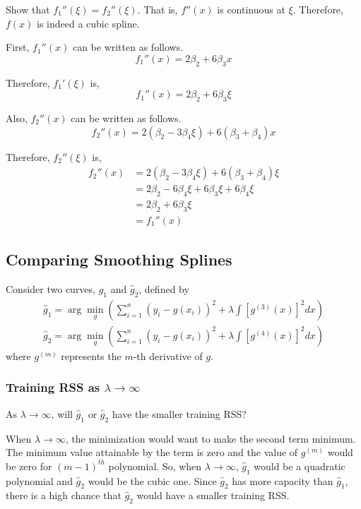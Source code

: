 \documentclass{article}
\begin{document}
\question
Show that $f_1''\left(\xi\right) = f_2''\left(\xi\right)$.
That is, $f''\left(x\right)$ is continuous at $\xi$.
Therefore, $f\left(x\right)$ is indeed a cubic spline.

\answer
First, $f_1''\left(x\right)$ can be written as follows.
\[
    f_1''\left(x\right) = 2 \beta_2 + 6 \beta_3 x
\]

Therefore, $f_1'\left(\xi\right)$ is,
\[
    f_1''\left(x\right) = 2 \beta_2 + 6 \beta_3 \xi
\]

Also, $f_2''\left(x\right)$ can be written as follows.
\[
    f_2''\left(x\right) = 2 \left(\beta_2 - 3 \beta_4 \xi \right) + 6 \left(\beta_3 + \beta_4\right) x
\]

Therefore, $f_2''\left(\xi\right)$ is,
\begin{equation*}
    \begin{split}
        f_2''\left(x\right) &= 2 \left(\beta_2 - 3 \beta_4 \xi \right) + 6 \left(\beta_3 + \beta_4\right) \xi \\
        &= 2 \beta_2 - 6 \beta_4 \xi + 6 \beta_3 \xi + 6 \beta_4 \xi \\
        &= 2 \beta_2 + 6 \beta_3 \xi \\
        &= f_1''\left(x\right)
    \end{split}
\end{equation*}

\subsection{Comparing Smoothing Splines}

Consider two curves, $\hat{g}_1$ and $\hat{g}_2$, defined by
\begin{gather*}
    \hat{g}_1 = \arg \min_g \left( \sum_{i=1}^n (y_i - g(x_i))^2 + \lambda \int \left[ g^{(3)}(x) \right]^2 dx \right) \\
    \hat{g}_2 = \arg \min_g \left( \sum_{i=1}^n (y_i - g(x_i))^2 + \lambda \int \left[ g^{(4)}(x) \right]^2 dx \right)
\end{gather*}
where $g^{(m)}$ represents the $m$-th derivative of $g$.

\subsubsection{Training RSS as $\lambda \to \infty$}

\question
As $\lambda \to \infty$, will $\hat{g}_1$ or $\hat{g}_2$ have the smaller training RSS?

\answer
When $\lambda \to \infty$, the minimization would want to make the second term minimum. 
The minimum value attainable by the term is zero and the value of $g^{(m)}$ would be zero for $(m-1)^{th}$ polynomial.
So, when $\lambda \to \infty$, $\hat{g}_1$ would be a quadratic polynomial and $\hat{g}_2$ would be the cubic one.
Since $\hat{g}_2$ has more capacity than $\hat{g}_1$, there is a high chance that $\hat{g}_2$ would have a smaller training RSS.
\end{document}
